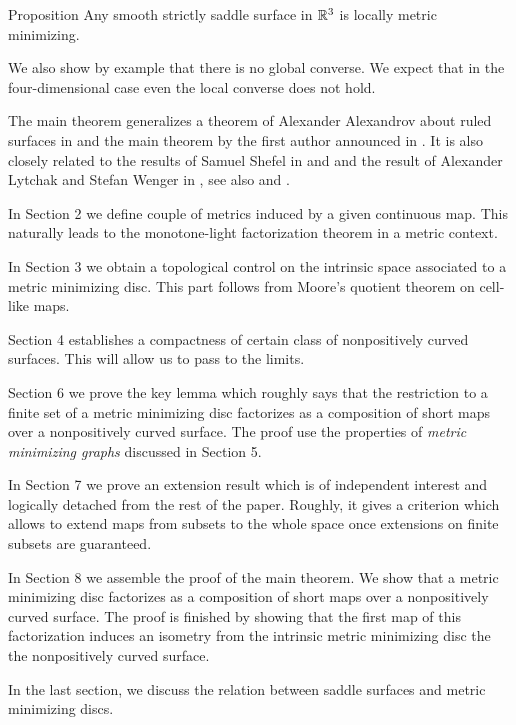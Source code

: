 \documentclass{article}
\begin{document}
\begin{thm}{Proposition}\label{prop:smooth}
Any smooth strictly saddle surface in $\mathbb{R}^3$ is locally metric minimizing.
\end{thm}

We also show by example that there is no global converse.
We expect that in the four-dimensional case even the local converse does not hold.

\medskip

The main theorem generalizes a theorem of Alexander Alexandrov about ruled surfaces in \cite{A} and the main theorem by the first author announced in \cite{petrunin-metric-min}.
It is also closely related to the results of Samuel Shefel in \cite{shefel-2D} and \cite{shefel-3D} and the result of Alexander Lytchak and Stefan Wenger 
in \cite{LW5}, see also \cite[Chapter 4]{akp} and \cite{petrunin-stadler}. 


In Section 2 we define couple of metrics induced by a given continuous map.
This naturally leads to the monotone-light factorization theorem in a metric context.
 
In Section 3 we obtain a topological control on the intrinsic space
associated to a metric minimizing disc. 
This part follows from Moore's quotient theorem on cell-like maps.
 
Section 4 establishes a compactness of certain class of nonpositively curved surfaces.
This will allow us to pass to the limits.
 
Section 6 we prove the key lemma which roughly says that the restriction to a finite set of
a metric minimizing disc factorizes as a composition of short maps over a nonpositively curved surface.
The proof use the properties of \emph{metric minimizing graphs} discussed in Section 5.
 
In Section 7 we prove an extension result which is of independent interest and logically detached
from the rest of the paper. Roughly, it gives a criterion which allows to extend maps from subsets
to the whole space once extensions on finite subsets are guaranteed.
 
In Section 8 we assemble the proof of the main theorem.
We show that a metric minimizing disc factorizes as a composition of short maps over a
nonpositively curved surface. The proof is finished by showing that the first map of this factorization
induces an isometry from the intrinsic metric minimizing disc the the nonpositively curved surface.

In the last section, we discuss the relation between saddle surfaces and metric minimizing discs.
\end{document}

